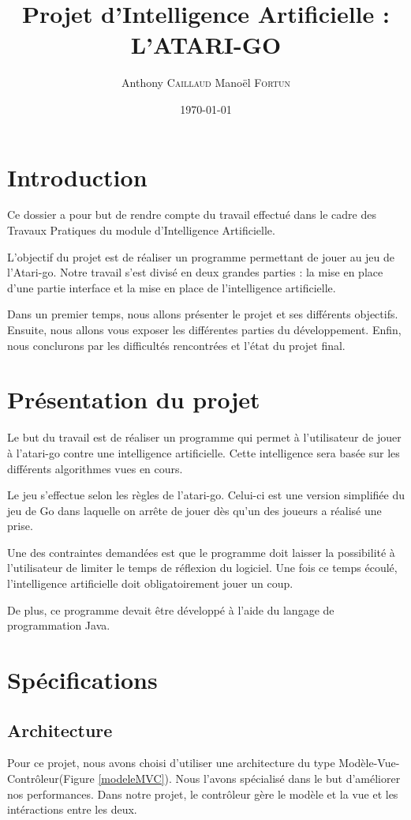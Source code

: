 \documentclass[11pt,a4paper]{article}
\title{Projet d'Intelligence Artificielle : L'ATARI-GO}
\author{Anthony \textsc{Caillaud} Manoël \textsc{Fortun}}
\date{\today}
\begin{document}
	\maketitle
	\clearpage
	\tableofcontents
	\clearpage

\section{Introduction}
Ce dossier a pour but de rendre compte du travail effectué dans le cadre des
Travaux Pratiques du module d'Intelligence Artificielle.

 L'objectif du projet est de réaliser un programme permettant de jouer au jeu
 de l'Atari-go. Notre travail s'est divisé en deux grandes parties : 
 la mise en place d'une partie interface et la mise en place de l'intelligence 
 artificielle.

Dans un premier temps, nous allons présenter le projet et ses
différents objectifs. Ensuite, nous allons vous exposer les
différentes parties du développement. Enfin, nous conclurons par les
difficultés rencontrées et l'état du projet final.

\section{Présentation du projet}
Le but du travail est de réaliser un programme qui permet à l'utilisateur de
jouer à l’atari-go contre une intelligence artificielle. Cette intelligence
sera basée sur les différents algorithmes vues en cours.

Le jeu s'effectue selon les règles de l'atari-go. Celui-ci est une version
simplifiée du jeu de Go dans laquelle on arrête de jouer dès qu’un des joueurs
a réalisé une prise.

Une des contraintes demandées est que le programme doit laisser la possibilité
à l'utilisateur de limiter le temps de réflexion du logiciel. Une
fois ce temps écoulé, l'intelligence artificielle doit obligatoirement jouer un
coup.

De plus, ce programme devait être développé à l'aide du langage de
programmation Java.
\clearpage
\section{Spécifications}
	\subsection{Architecture}
	Pour ce projet, nous avons choisi d'utiliser une architecture du type
	Modèle-Vue-Contrôleur(Figure \ref{modeleMVC}). Nous l'avons spécialisé dans le
	but d'améliorer nos performances. Dans notre projet, le contrôleur gère le
	modèle et la vue et les intéractions entre les deux.
	
\end{document}
